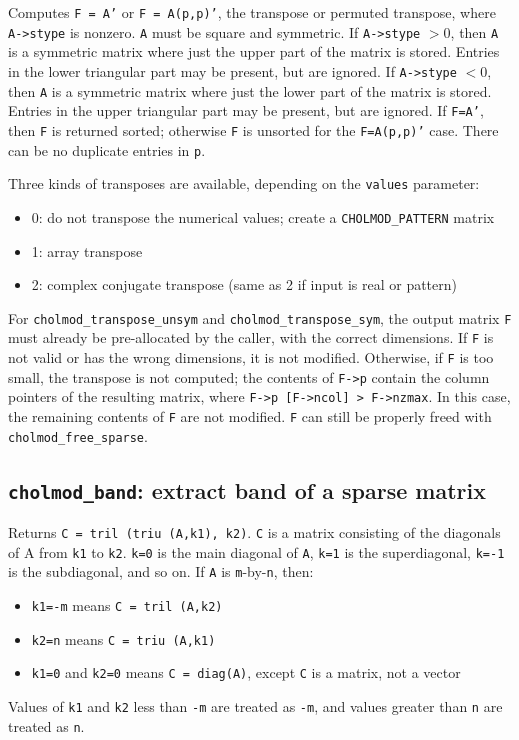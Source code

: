 \documentclass[11pt]{article}
\begin{document}

Computes {\tt F = A'} or {\tt F = A(p,p)'}, the transpose or permuted transpose, where
{\tt A->stype} is nonzero.  {\tt A} must be square and symmetric.
If {\tt A->stype} $> 0$, then {\tt A} is a symmetric matrix where just the upper part
of the matrix is stored.  Entries in the lower triangular part may be
present, but are ignored.
If {\tt A->stype} $< 0$, then {\tt A} is a symmetric matrix where just the lower part
of the matrix is stored.  Entries in the upper triangular part may be present, but are ignored.
If {\tt F=A'}, then {\tt F} is returned
sorted; otherwise {\tt F} is unsorted for the {\tt F=A(p,p)'} case.
There can be no duplicate entries in {\tt p}.

Three kinds of transposes are available, depending on the {\tt values} parameter:
\begin{itemize}
\item    0: do not transpose the numerical values; create a {\tt CHOLMOD\_PATTERN} matrix
\item    1: array transpose
\item    2: complex conjugate transpose (same as 2 if input is real or pattern)
\end{itemize}

For {\tt cholmod\_transpose\_unsym} and {\tt cholmod\_transpose\_sym}, the output matrix
{\tt F} must already be pre-allocated by the caller, with the correct dimensions.
If {\tt F} is not valid or has the wrong dimensions, it is not modified.
Otherwise, if {\tt F} is too small, the transpose is not computed; the contents
of {\tt F->p} contain the column pointers of the resulting matrix, where
{\tt F->p [F->ncol] > F->nzmax}.  In this case, the remaining contents of {\tt F} are
not modified.  {\tt F} can still be properly freed with {\tt cholmod\_free\_sparse}.

\newpage \subsection{{\tt cholmod\_band}: extract band of a sparse matrix}


Returns {\tt C = tril (triu (A,k1), k2)}.
{\tt C} is a matrix consisting of the diagonals of A from {\tt k1} to {\tt k2}.
{\tt k=0} is the main diagonal of {\tt A}, {\tt k=1} is the superdiagonal, {\tt k=-1} is the
subdiagonal, and so on.  If {\tt A} is {\tt m}-by-{\tt n}, then:
\begin{itemize}
\item {\tt k1=-m} means {\tt C = tril (A,k2)}
\item {\tt k2=n} means {\tt C = triu (A,k1)}
\item {\tt k1=0} and {\tt k2=0} means {\tt C = diag(A)}, except {\tt C} is a matrix, not a vector
\end{itemize}
Values of {\tt k1} and {\tt k2} less than {\tt -m} are treated as {\tt -m}, and values greater
than {\tt n} are treated as {\tt n}.
\end{document}
